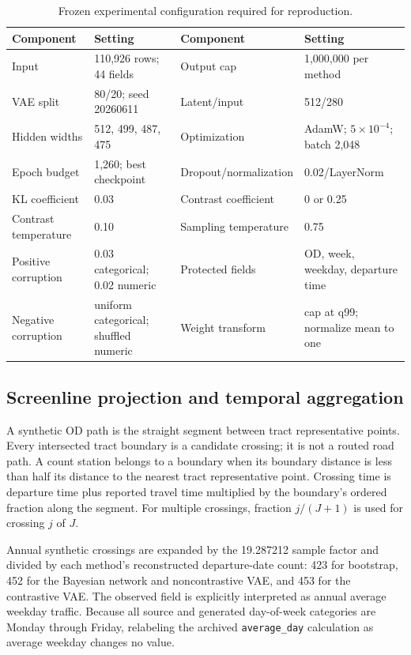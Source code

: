 \documentclass[numbered]{trbunofficial}
\begin{document}
\begin{table}[!htbp]
\caption{Frozen experimental configuration required for reproduction.}
\label{tab:config}
\centering
\footnotesize
\setlength{\tabcolsep}{4pt}
\begin{tabularx}{\textwidth}{P{0.21\textwidth}Y P{0.21\textwidth}Y}
\toprule
\textbf{Component} & \textbf{Setting} & \textbf{Component} & \textbf{Setting} \\
\midrule
Input & 110,926 rows; 44 fields & Output cap & 1,000,000 per method \\
VAE split & 80/20; seed 20260611 & Latent/input & 512/280 \\
Hidden widths & 512, 499, 487, 475 & Optimization & AdamW; $5\times10^{-4}$; batch 2,048 \\
Epoch budget & 1,260; best checkpoint & Dropout/normalization & 0.02/LayerNorm \\
KL coefficient & 0.03 & Contrast coefficient & 0 or 0.25 \\
Contrast temperature & 0.10 & Sampling temperature & 0.75 \\
Positive corruption & 0.03 categorical; 0.02 numeric & Protected fields & OD, week, weekday, departure time \\
Negative corruption & uniform categorical; shuffled numeric & Weight transform & cap at q99; normalize mean to one \\
\bottomrule
\end{tabularx}
\end{table}

\subsection{Screenline projection and temporal aggregation}

A synthetic OD path is the straight segment between tract representative points. Every intersected tract boundary is a candidate crossing; it is not a routed road path. A count station belongs to a boundary when its boundary distance is less than half its distance to the nearest tract representative point. Crossing time is departure time plus reported travel time multiplied by the boundary's ordered fraction along the segment. For multiple crossings, fraction $j/(J+1)$ is used for crossing $j$ of $J$.

Annual synthetic crossings are expanded by the 19.287212 sample factor and divided by each method's reconstructed departure-date count: 423 for bootstrap, 452 for the Bayesian network and noncontrastive VAE, and 453 for the contrastive VAE. The observed field is explicitly interpreted as annual average weekday traffic. Because all source and generated day-of-week categories are Monday through Friday, relabeling the archived \texttt{average\_day} calculation as average weekday changes no value.
\end{document}

